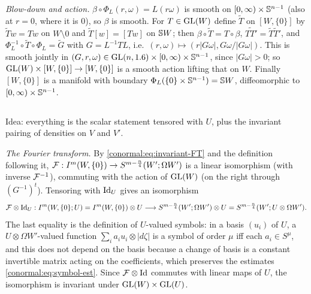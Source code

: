 \emph{Blow-down and action.} $\beta\circ\Phi_L(r,\omega)=L(r\omega)$ is smooth on
$[0,\infty)\times\mathbb{S}^{n-1}$ (also at $r=0$, where it is $0$), so $\beta$ is smooth. For
$T\in\operatorname{GL}(W)$ define $\tilde T$ on $[W,\{0\}]$ by $\tilde Tw=Tw$ on $W\setminus0$ and
$\tilde T[w]=[Tw]$ on $\mathbb{S} W$; then $\beta\circ\tilde T=T\circ\beta$, $\widetilde{TT'}=
\tilde T\tilde T'$, and $\Phi_L^{-1}\circ\tilde T\circ\Phi_L=\tilde G$ with
$G=L^{-1}TL$, i.e.\ $(r,\omega)\mapsto(r|G\omega|,G\omega/|G\omega|)$. This is smooth jointly in
$(G,r,\omega)\in\operatorname{GL}(n,1.6)\times[0,\infty)\times\mathbb{S}^{n-1}$, since $|G\omega|>0$; so
$\operatorname{GL}(W)\times[W,\{0\}]\to[W,\{0\}]$ is a smooth action lifting that on $W$. Finally
$[W,\{0\}]$ is a manifold with boundary $\Phi_L(\{0\}\times\mathbb{S}^{n-1})=\mathbb{S} W$,
diffeomorphic to $[0,\infty)\times\mathbb{S}^{n-1}$.

\subsection*{}
Idea: everything is the scalar statement tensored with $U$, plus the invariant pairing of
densities on $V$ and $V'$.

\emph{The Fourier transform.} By \eqref{conormal:eq:invariant-FT} and the definition following
it, $\mathcal{F}:I^{m}(W,\{0\})\to S^{m-\frac n4}(W';\Omega W')$ is a linear isomorphism (with inverse
$\mathcal{F}^{-1}$), commuting with the action of $\operatorname{GL}(W)$ (on the right through $(G^{-1})^t$).
Tensoring with $\operatorname{Id}_U$ gives an isomorphism
\begin{equation*}
\mathcal{F}\otimes\operatorname{Id}_U:I^{m}(W,\{0\};U)=I^{m}(W,\{0\})\otimes U\longrightarrow
S^{m-\frac n4}(W';\Omega W')\otimes U=S^{m-\frac n4}(W';U\otimes\Omega W').
\end{equation*}
The last equality is the definition of $U$-valued symbols: in a basis $(u_i)$ of $U$, a
$U\otimes\Omega W'$-valued function $\sum_ia_iu_i\otimes|d\zeta|$ is a symbol of order $\mu$ iff
each $a_i\in S^\mu$, and this does not depend on the basis because a change of basis is a
constant invertible matrix acting on the coefficients, which preserves the estimates
\eqref{conormal:eq:symbol-est}. Since $\mathcal{F}\otimes\operatorname{Id}$ commutes with linear maps of $U$, the
isomorphism is invariant under $\operatorname{GL}(W)\times\operatorname{GL}(U)$.

